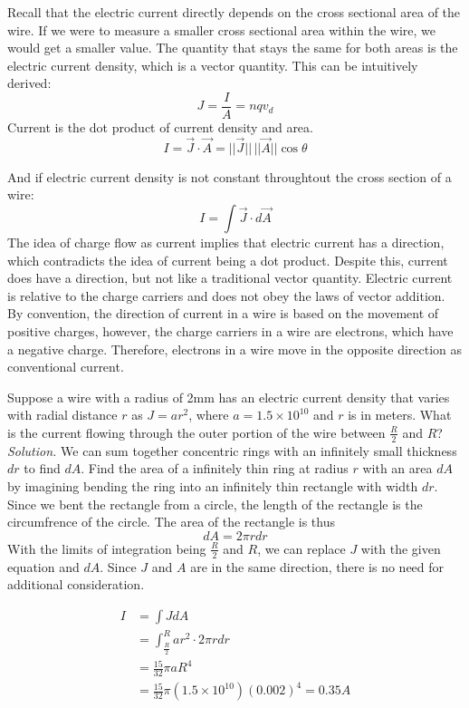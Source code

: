\documentclass[12pt, titlepage]{article}
\begin{document}
Recall that the electric current directly depends on the cross sectional area of the wire. If we were to measure a smaller cross sectional area within the wire, we would get a smaller value. The quantity that stays the same for both areas is the electric current density, which is a vector quantity. This can be intuitively derived:
\begin{equation*}
    J = \frac{I}{A} = nqv_d
\end{equation*}
Current is the dot product of current density and area.
\begin{equation*}
    I = \vec{J} \cdot \vec{A} = ||\vec{J}||\,||\vec{A}|| \cos{\theta}
\end{equation*}

And if electric current density is not constant throughtout the cross section of a wire:
\begin{equation*}
    I = \int \vec{J} \cdot d\vec{A}
\end{equation*}
The idea of charge flow as current implies that electric current has a direction, which contradicts the idea of current being a dot product. Despite this, current does have a direction, but not like a traditional vector quantity. Electric current is relative to the charge carriers and does not obey the laws of vector addition. By convention, the direction of current in a wire is based on the movement of positive charges, however, the charge carriers in a wire are electrons, which have a negative charge. Therefore, electrons in a wire move in the opposite direction as conventional current.
\begin{Problem}
    Suppose a wire with a radius of 2mm has an electric current density that varies with radial distance $r$ as $J = ar^2$, where $a=1.5\times 10^{10}$ and $r$ is in meters. What is the current flowing through the outer portion of the wire between $\frac{R}{2}$ and $R$?
    \tcblower
    \textit{Solution. } We can sum together concentric rings with an infinitely small thickness $dr$ to find $dA$. Find the area of a infinitely thin ring at radius $r$ with an area $dA$ by imagining bending the ring into an infinitely thin rectangle with width $dr$. Since we bent the rectangle from a circle, the length of the rectangle is the circumfrence of the circle. The area of the rectangle is thus 
    \begin{equation*}
        dA = 2\pi r dr
    \end{equation*}
    With the limits of integration being $\frac{R}{2}$ and $R$, we can replace $J$ with the given equation and $dA$. Since $J$ and $A$ are in the same direction, there is no need for additional consideration. 

    \begin{align*}
        I &= \int J dA \\
        &= \int_{\frac{R}{2}}^{R}ar^2\cdot 2\pi r dr \\
        &= \frac{15}{32}\pi aR^4 \\
        &= \frac{15}{32} \pi (1.5 \times 10^{10})(0.002)^4= 0.35A
    \end{align*}
\end{Problem}
\end{document}

